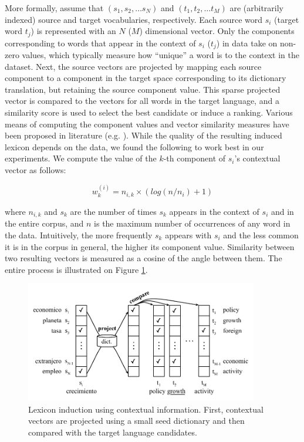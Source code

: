 \documentclass{article}
\begin{document}
More formally, assume that $(s_{1}, s_{2}, \dots s_{N})$ and $(t_{1}, t_{2}, \dots t_{M})$ are (arbitrarily indexed) source and target vocabularies, respectively.  Each source word $s_{i}$ (target word $t_{j}$) is represented with an $N$ ($M$) dimensional vector.  Only the components corresponding to words that appear in the context of $s_{i}$ ($t_{j}$) in data take on non-zero values, which typically measure how ``unique'' a word is to the context in the dataset.  Next, the source vectors are projected by mapping each source component to a component in the target space corresponding to its dictionary translation, but retaining the source component value.  This sparse projected vector is compared to the vectors for all words in the target language, and a similarity score is used to select the best candidate or induce a ranking.  Various means of computing the component values and vector similarity measures have been proposed in literature (e.g. \cite{Rapp:1999,Fung:1998}).  While the quality of the resulting induced lexicon depends on the data, we found the following to work best in our experiments.  We compute the value of the $k$-th component of $s_{i}$'s contextual vector  as follows: 

\begin{equation*}
w_{k}^{(i)} = n_{i,k} \times (log( {n / n_{i}}) + 1)
\end{equation*}

\noindent where $n_{i,k}$ and $s_{k}$ are the number of times $s_{k}$ appears in the context of $s_{i}$ and in the entire corpus, and $n$ is the maximum number of occurrences of any word in the data.  Intuitively, the more frequently $s_{k}$ appears with $s_{i}$ and the less common it is in the corpus in general, the higher its component value.  Similarity between two resulting vectors is measured as a cosine of the angle between them.  The entire process is illustrated on Figure \ref{fig:contextual}.\\

\begin{figure}
\centerline{\mbox{\includegraphics[width=4.0in]{figures/contextual}}}
\caption{Lexicon induction using contextual information. First, contextual vectors are projected using a small seed dictionary and then compared with the target language candidates.}
\label{fig:contextual}
\end{figure}
\end{document}
